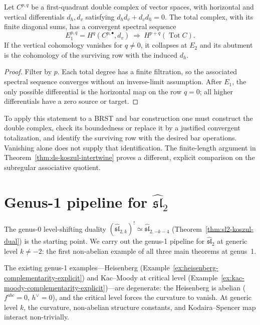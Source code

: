 \begin{proposition}
\label{prop:bar-whittaker}
Let $C^{p,q}$ be a first-quadrant double complex of vector spaces, with horizontal and vertical differentials $d_h,d_v$ satisfying $d_hd_v+d_vd_h=0$.
The total complex, with its finite diagonal sums, has a convergent spectral sequence
\begin{equation}\label{eq:whittaker-ss}
 E_1^{p,q}=H^q(C^{p,\bullet},d_v)\ \Longrightarrow\ H^{p+q}(\operatorname{Tot}C).
\end{equation}
If the vertical cohomology vanishes for $q\ne0$, it collapses at $E_2$ and its abutment is the cohomology of the surviving row with the induced $d_h$.
\end{proposition}
\begin{proof}
Filter by $p$.
Each total degree has a finite filtration, so the associated spectral sequence converges without an inverse-limit assumption.
After $E_1$, the only possible differential is the horizontal map on the row $q=0$; all higher differentials have a zero source or target.
\end{proof}
To apply this statement to a BRST and bar construction one must construct the double complex, check its boundedness or replace it by a justified convergent totalization, and identify the surviving row with the desired bar operations.
Vanishing alone does not supply that identification.
The finite-length argument in Theorem~\ref{thm:ds-koszul-intertwine} proves a different, explicit comparison on the subregular associative quotient.

\section{\texorpdfstring{Genus-1 pipeline for $\widehat{\mathfrak{sl}}_2$}{Genus-1 pipeline for sl-2}}
\label{sec:sl2-genus-one-pipeline}

The genus-0 level-shifting duality $(\widehat{\mathfrak{sl}}_{2,k})^! \simeq \widehat{\mathfrak{sl}}_{2,-k-4}$ (Theorem~\ref{thm:sl2-koszul-dual}) is the starting point.  We carry out the genus-1 pipeline for $\widehat{\mathfrak{sl}}_2$ at generic level $k \neq -2$: the first non-abelian example of all three main theorems at genus~1.

The existing genus-1 examples---Heisenberg (Example~\ref{ex:heisenberg-complementarity-explicit}) and Kac--Moody at critical level (Example~\ref{ex:kac-moody-complementarity-explicit})---are degenerate: the Heisenberg is abelian ($f^{abc}=0$, $h^\vee=0$), and the critical level forces the curvature to vanish.  At generic level $k$, the curvature, non-abelian structure constants, and Kodaira--Spencer map interact non-trivially.

